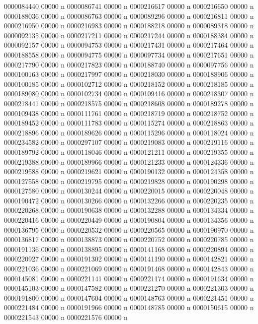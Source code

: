 {{{{{{{0000084440 00000 n 
0000086741 00000 n 
0000216617 00000 n 
0000216650 00000 n 
0000188036 00000 n 
0000086763 00000 n 
0000089296 00000 n 
0000216811 00000 n 
0000216950 00000 n 
0000216983 00000 n 
0000188218 00000 n 
0000089318 00000 n 
0000092135 00000 n 
0000217211 00000 n 
0000217244 00000 n 
0000188384 00000 n 
0000092157 00000 n 
0000094753 00000 n 
0000217431 00000 n 
0000217464 00000 n 
0000188558 00000 n 
0000094775 00000 n 
0000097734 00000 n 
0000217651 00000 n 
0000217790 00000 n 
0000217823 00000 n 
0000188740 00000 n 
0000097756 00000 n 
0000100163 00000 n 
0000217997 00000 n 
0000218030 00000 n 
0000188906 00000 n 
0000100185 00000 n 
0000102712 00000 n 
0000218152 00000 n 
0000218185 00000 n 
0000189080 00000 n 
0000102734 00000 n 
0000109416 00000 n 
0000218307 00000 n 
0000218441 00000 n 
0000218575 00000 n 
0000218608 00000 n 
0000189278 00000 n 
0000109438 00000 n 
0000111761 00000 n 
0000218719 00000 n 
0000218752 00000 n 
0000189452 00000 n 
0000111783 00000 n 
0000115274 00000 n 
0000218863 00000 n 
0000218896 00000 n 
0000189626 00000 n 
0000115296 00000 n 
0000118024 00000 n 
0000234582 00000 n 
0000297107 00000 n 
0000219083 00000 n 
0000219116 00000 n 
0000189792 00000 n 
0000118046 00000 n 
0000121211 00000 n 
0000219355 00000 n 
0000219388 00000 n 
0000189966 00000 n 
0000121233 00000 n 
0000124336 00000 n 
0000219588 00000 n 
0000219621 00000 n 
0000190132 00000 n 
0000124358 00000 n 
0000127558 00000 n 
0000219795 00000 n 
0000219828 00000 n 
0000190298 00000 n 
0000127580 00000 n 
0000130244 00000 n 
0000220015 00000 n 
0000220048 00000 n 
0000190472 00000 n 
0000130266 00000 n 
0000132266 00000 n 
0000220235 00000 n 
0000220268 00000 n 
0000190638 00000 n 
0000132288 00000 n 
0000134334 00000 n 
0000220416 00000 n 
0000220449 00000 n 
0000190804 00000 n 
0000134356 00000 n 
0000136795 00000 n 
0000220532 00000 n 
0000220565 00000 n 
0000190970 00000 n 
0000136817 00000 n 
0000138873 00000 n 
0000220752 00000 n 
0000220785 00000 n 
0000191136 00000 n 
0000138895 00000 n 
0000141168 00000 n 
0000220894 00000 n 
0000220927 00000 n 
0000191302 00000 n 
0000141190 00000 n 
0000142821 00000 n 
0000221036 00000 n 
0000221069 00000 n 
0000191468 00000 n 
0000142843 00000 n 
0000145081 00000 n 
0000221141 00000 n 
0000221174 00000 n 
0000191634 00000 n 
0000145103 00000 n 
0000147582 00000 n 
0000221270 00000 n 
0000221303 00000 n 
0000191800 00000 n 
0000147604 00000 n 
0000148763 00000 n 
0000221451 00000 n 
0000221484 00000 n 
0000191966 00000 n 
0000148785 00000 n 
0000150615 00000 n 
0000221543 00000 n 
0000221576 00000 n 
}}}}}}}
